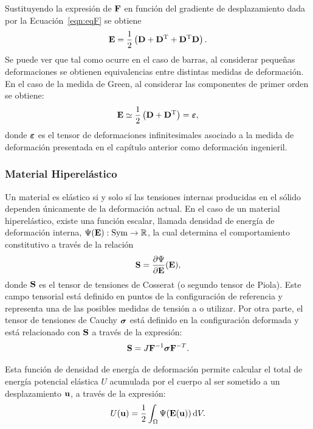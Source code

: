 Sustituyendo la expresión de ${\bf F}$ en función del gradiente de desplazamiento dada por la Ecuación~\eqref{eqn:eqF} se obtiene
%
\begin{equation}
{\bf E} = \frac{1}{2} \left( {\bf D} + {\bf D}^{\text{T}} + {\bf D}^{\text{T}} {\bf D} \right).
\end{equation}
%
Se puede ver que tal como ocurre en el caso de barras, al considerar pequeñas deformaciones se obtienen equivalencias entre distintas medidas de deformación. %
%
En el caso de la medida de Green, al considerar las componentes de primer orden se obtiene:
\begin{equation}
{\bf E} \simeq \frac{1}{2} \left(  {\bf D} + {\bf D}^{\text{T}} \right) = \boldsymbol{\varepsilon}, 
\end{equation}
%
donde $\boldsymbol{\varepsilon}$ es el tensor de deformaciones infinitesimales asociado a la medida de deformación presentada en el capítulo anterior como deformación ingenieril.



\subsubsection{Material Hiperelástico}

Un material es elástico si y solo sí las tensiones internas producidas en el sólido dependen únicamente de la deformación actual. %
%
En el caso de un material hiperelástico, existe una función escalar, llamada densidad de energía de deformación interna, $\Psi({\bf E}):\text{Sym}\rightarrow {\mathbb R} $, la cual determina el comportamiento constitutivo a través de la relación 
%
\begin{equation}
{\bf S} = \frac{\partial \Psi}{ \partial {\bf E} } ({\bf E}),
\end{equation}
donde ${\bf S}$ es el tensor de tensiones de Cosserat (o segundo tensor de Piola). %
%
Este campo tensorial está definido en puntos de la configuración de referencia y representa una de las posibles medidas de tensión a o utilizar. %
Por otra parte, el tensor de tensiones de Cauchy $\boldsymbol{\sigma}$ está definido en la configuración deformada y está relacionado con ${\bf S}$ a través de la expresión:
%
\begin{equation}
{\bf S} = J {\bf F}^{-1} \boldsymbol{\sigma} {\bf F}^{-T}.
\end{equation}
%

%
Esta función de densidad de energía de deformación permite calcular el total de energía potencial elástica $U$ acumulada por el cuerpo al ser sometido a un desplazamiento ${\bf u}$, a través de la expresión:
%
\begin{equation}
U({\bf u}) =  \frac{1}{2} \int_{\Omega} \Psi ({\bf E}( {\bf u} ) ) \, {\text{d}} V.
\end{equation}
%


